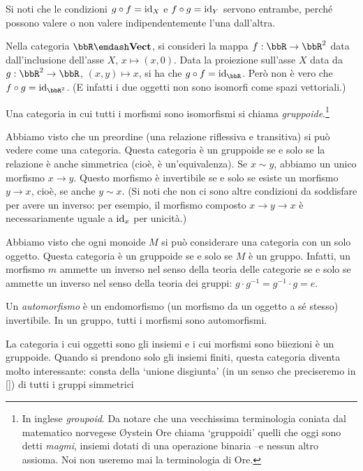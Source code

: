 Si noti che le condizioni $g\circ f = \mathrm{id}_X$ e $f\circ g=\mathrm{id}_Y$ servono entrambe, perché possono valere o non valere indipendentemente l'una dall'altra.
\begin{example}
 Nella categoria $\bbR\emdash\ctVect$, si consideri la mappa $f:\bbR\to\bbR^2$ data dall'inclusione dell'asse $X$, $x\mapsto(x,0)$. Data la proiezione sull'asse $X$ data da $g:\bbR^2\to\bbR$, $(x,y)\mapsto x$, si ha che $g\circ f=\id_\bbR$. Però non è vero che $f\circ g = \id_{\bbR^2}$. (E infatti i due oggetti non sono isomorfi come spazi vettoriali.)
\end{example}

\begin{definition}
 Una categoria in cui tutti i morfismi sono isomorfismi si chiama \emph{gruppoide}.\footnote{In inglese \emph{groupoid}. Da notare che una vecchissima terminologia coniata dal matematico norvegese Øystein Ore chiama `gruppoidi' quelli che oggi sono detti \emph{magmi}, insiemi dotati di una operazione binaria --e nessun altro assioma. Noi non useremo mai la terminologia di Ore.}
\end{definition}

\begin{example}
 Abbiamo visto che un preordine (una relazione riflessiva e transitiva) si può vedere come una categoria. Questa categoria è un gruppoide se e solo se la relazione è anche simmetrica (cioè, è un'equivalenza). Se $x\sim y$, abbiamo un unico morfismo $x\to y$. Questo morfismo è invertibile se e solo se esiste un morfismo $y\to x$, cioè, se anche $y\sim x$. (Si noti che non ci sono altre condizioni da soddisfare per avere un inverso: per esempio, il morfismo composto $x\to y\to x$ è necessariamente uguale a $\mathrm{id}_x$ per unicità.)
\end{example}

\begin{example}
 Abbiamo visto che ogni monoide $M$ si può considerare una categoria con un solo oggetto. Questa categoria è un gruppoide se e solo se $M$ è un gruppo. Infatti, un morfismo $m$ ammette un inverso nel senso della teoria delle categorie se e solo se ammette un inverso nel senso della teoria dei gruppi: $g\cdot g^{-1}=g^{-1}\cdot g = e$.
\end{example}

Un \emph{automorfismo} è un endomorfismo (un morfismo da un oggetto a sé stesso) invertibile. In un gruppo, tutti i morfismi sono automorfismi.

\begin{example}
 La categoria i cui oggetti sono gli insiemi e i cui morfismi sono biiezioni è un gruppoide. Quando si prendono solo gli insiemi finiti, questa categoria diventa molto interessante: consta della `unione disgiunta' (in un senso che preciseremo in \ref{}) di tutti i gruppi simmetrici\Todo{}
\end{example}

